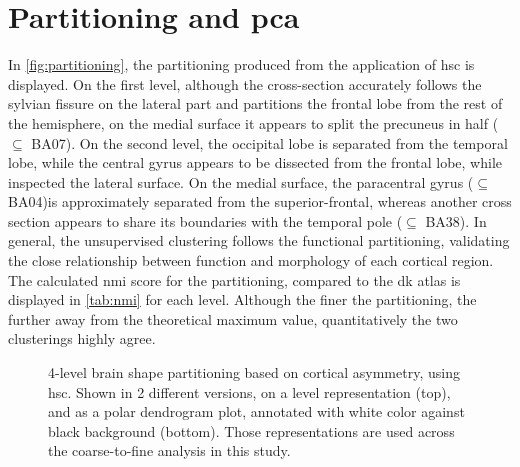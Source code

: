 \section{Partitioning and \ac{pca}}
In \autoref{fig:partitioning}, the partitioning produced from the application of \ac{hsc} is displayed. On the first level, although the cross-section accurately follows the sylvian fissure on the lateral part and partitions the frontal lobe from the rest of the hemisphere, on the medial surface it appears to split the precuneus in half ($\subseteq$ BA07). On the second level, the occipital lobe is separated from the temporal lobe, while the central gyrus appears to be dissected from the frontal lobe, while inspected the lateral surface. On the medial surface, the paracentral gyrus ($\subseteq$ BA04)is approximately separated from the superior-frontal, whereas another cross section appears to share its boundaries with the temporal pole ($\subseteq$ BA38). In general, the unsupervised clustering follows the functional partitioning, validating the close relationship  between function and morphology of each cortical region. The calculated \ac{nmi} score for the partitioning, compared to the \ac{dk} atlas is displayed in \autoref{tab:nmi} for each level. Although the finer the partitioning, the further away from the theoretical maximum value, quantitatively the two clusterings highly agree.

\begin{figure}[H]
	\begin{adjustwidth}{-4cm}{-4cm}
	\centering
	\subfloat[]{
		
	}\quad
	\subfloat[]{
		
	}

\end{adjustwidth}
\caption[4-level brain shape partitioning based on asymmetry]{4-level brain shape partitioning based on cortical asymmetry, using \ac{hsc}. Shown in 2 different versions, on a level representation (top), and as a polar dendrogram plot, annotated with white color against black background (bottom). Those representations are used across the coarse-to-fine analysis in this study.}
\label{fig:partitioning}
\end{figure}

